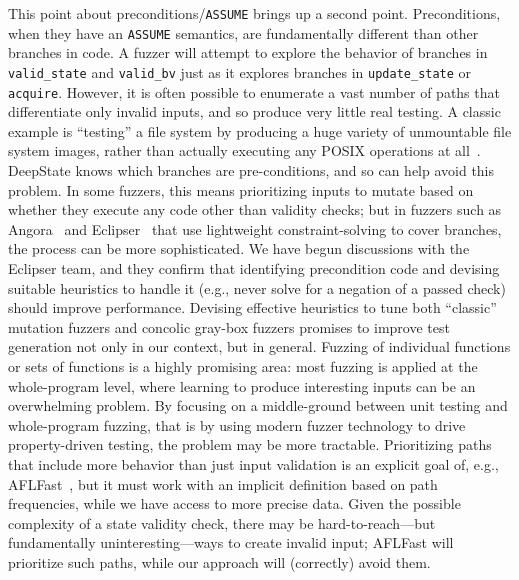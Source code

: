   This point about preconditions/{\tt ASSUME} brings up a second point.  Preconditions, when they have an {\tt ASSUME} semantics, are fundamentally different than other branches in code.  A fuzzer will attempt to explore the behavior of branches in {\tt valid\_state} and {\tt valid\_bv} just as it explores branches in {\tt update\_state} or {\tt acquire}.  However, it is often possible to enumerate a vast number of paths that differentiate only invalid inputs, and so produce very little real testing.  A classic example is ``testing'' a file system by producing a huge variety of unmountable file system images, rather than actually executing any POSIX operations at all~\cite{CFV08,AMAI}.  DeepState knows which branches are pre-conditions, and so can help avoid this problem.  In some fuzzers, this means prioritizing inputs to mutate based on whether they execute any code other than validity checks; but in fuzzers such as Angora~\cite{angora} and Eclipser~\cite{eclipser} that use lightweight constraint-solving to cover branches, the process can be more sophisticated.  We have begun discussions with the Eclipser team, and they confirm that identifying precondition code and devising suitable heuristics to handle it (e.g., never solve for a negation of a passed check) should improve performance.  Devising effective heuristics to tune both ``classic'' mutation fuzzers and concolic gray-box fuzzers promises to improve test generation not only in our context, but in general.  Fuzzing of individual functions or sets of functions is a highly promising area: most fuzzing is applied at the whole-program level, where learning to produce interesting inputs can be an overwhelming problem.  By focusing on a middle-ground between unit testing and whole-program fuzzing, that is by using modern fuzzer technology to drive property-driven testing, the problem may be more tractable.  Prioritizing paths that include more behavior than just input validation is an explicit goal of, e.g., AFLFast~\cite{aflfast}, but it must work with an implicit definition based on path frequencies, while we have access to more precise data.  Given the possible complexity of a state validity check, there may be hard-to-reach---but fundamentally uninteresting---ways to create invalid input; AFLFast will prioritize such paths, while our approach will (correctly) avoid them.

